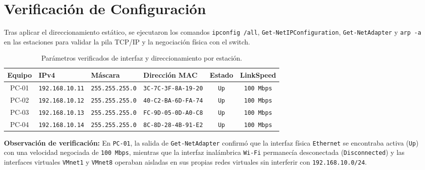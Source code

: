 \documentclass[11pt, a4paper]{article}
\begin{document}
\section{Verificación de Configuración}

Tras aplicar el direccionamiento estático, se ejecutaron los comandos \texttt{ipconfig /all}, \texttt{Get-NetIPConfiguration}, \texttt{Get-NetAdapter} y \texttt{arp -a} en las estaciones para validar la pila TCP/IP y la negociación física con el switch.

\begin{table}[h!]
\centering
\small
\setlength{\tabcolsep}{4pt}
\caption{Parámetros verificados de interfaz y direccionamiento por estación.}
\begin{tabularx}{\textwidth}{c >{\centering\arraybackslash}X >{\centering\arraybackslash}X >{\centering\arraybackslash}X c c}
\toprule
\textbf{Equipo} & \textbf{IPv4} & \textbf{Máscara} & \textbf{Dirección MAC} & \textbf{Estado} & \textbf{LinkSpeed} \\
\midrule
PC-01 & \texttt{192.168.10.11} & \texttt{255.255.255.0} & \texttt{3C-7C-3F-8A-19-20} & \texttt{Up} & \texttt{100 Mbps} \\
PC-02 & \texttt{192.168.10.12} & \texttt{255.255.255.0} & \texttt{40-C2-BA-6D-FA-74} & \texttt{Up} & \texttt{100 Mbps} \\
PC-03 & \texttt{192.168.10.13} & \texttt{255.255.255.0} & \texttt{FC-9D-05-0D-A0-C8} & \texttt{Up} & \texttt{100 Mbps} \\
PC-04 & \texttt{192.168.10.14} & \texttt{255.255.255.0} & \texttt{8C-8D-28-4B-91-E2} & \texttt{Up} & \texttt{100 Mbps} \\
\bottomrule
\end{tabularx}
\end{table}

\noindent \textbf{Observación de verificación:} En \texttt{PC-01}, la salida de \texttt{Get-NetAdapter} confirmó que la interfaz física \texttt{Ethernet} se encontraba activa (\texttt{Up}) con una velocidad negociada de \texttt{100 Mbps}, mientras que la interfaz inalámbrica \texttt{Wi-Fi} permanecía desconectada (\texttt{Disconnected}) y las interfaces virtuales \texttt{VMnet1} y \texttt{VMnet8} operaban aisladas en sus propias redes virtuales sin interferir con \texttt{192.168.10.0/24}.
\end{document}
